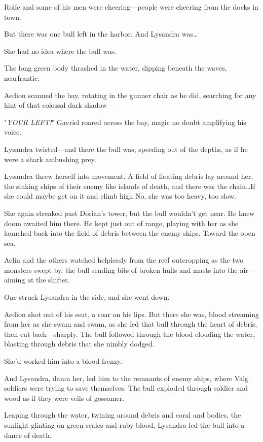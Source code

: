 Rolfe and some of his men were cheering---people were cheering from the docks in town.

But there was one bull left in the harbor.
And Lysandra was\ldots{}

She had no idea where the bull was.

The long green body thrashed in the water, dipping beneath the waves, nearfrantic.

Aedion scanned the bay, rotating in the gunner chair as he did, searching for any hint of that colossal dark shadow---

"\emph{YOUR LEFT!}" Gavriel roared across the bay, magic no doubt amplifying his voice.

Lysandra twisted---and there the bull was, speeding out of the depths, as if he were a shark ambushing prey.

Lysandra threw herself into movement.
A field of floating debris lay around her, the sinking ships of their enemy like islands of death, and there was the chain\ldots If she could maybe get on it and climb high  No, she was too heavy, too slow.

She again streaked past Dorian's tower, but the bull wouldn't get near.
He knew doom awaited him there.
He kept just out of range, playing with her as she launched back into the field of debris between the enemy ships.
Toward the open sea.

Aelin and the others watched helplessly from the reef outcropping as the two monsters swept by, the bull sending bits of broken hulls and masts into the air--- aiming at the shifter.

One struck Lysandra in the side, and she went down.

Aedion shot out of his seat, a roar on his lips.
But there she was, blood streaming from her as she swam and swam, as she led that bull through the heart of debris, then cut back---sharply.
The bull followed through the blood clouding the water, blasting through debris that she nimbly dodged.

She'd worked him into a blood-frenzy.

And Lysandra, damn her, led him to the remnants of enemy ships, where Valg soldiers were trying to save themselves.
The bull exploded through soldier and wood as if they were veils of gossamer.

Leaping through the water, twining around debris and coral and bodies, the sunlight glinting on green scales and ruby blood, Lysandra led the bull into a dance of death.

